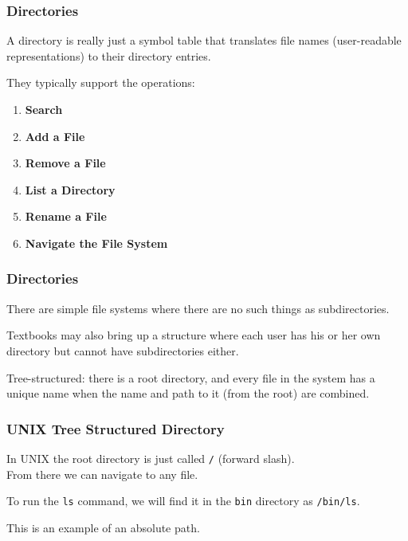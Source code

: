 \begin{frame}
\frametitle{Directories}

A directory is really just a symbol table that translates file names (user-readable representations) to their directory entries.

They typically support the operations:

\begin{enumerate}
	\item \textbf{Search}
	\item \textbf{Add a File}
	\item \textbf{Remove a File}
	\item \textbf{List a Directory}
	\item \textbf{Rename a File}
	\item \textbf{Navigate the File System}
\end{enumerate}


\end{frame}

\begin{frame}
\frametitle{Directories}

There are simple file systems where there are no such things as subdirectories.

Textbooks may also bring up a structure where each user has his or her own directory but cannot have subdirectories either. 

Tree-structured: there is a root directory, and every file in the system has a unique name when the name and path to it (from the root) are combined.

\end{frame}

\begin{frame}
\frametitle{UNIX Tree Structured Directory}

In UNIX the root directory is just called \texttt{/} (forward slash).\\
\quad From there we can navigate to any file. 

To run the \texttt{ls} command, we will find it in the \texttt{bin} directory as \texttt{/bin/ls}. 

This is an example of an absolute path.

\end{frame}

